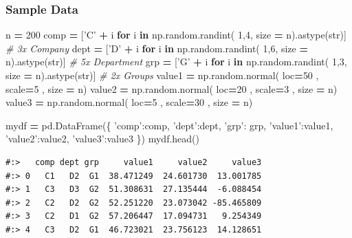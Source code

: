 \documentclass[
]{book}
\newenvironment{Shaded}{\begin{snugshade}}{\end{snugshade}}
\newcommand{\BuiltInTok}[1]{#1}
\newcommand{\CommentTok}[1]{\textcolor[rgb]{0.37,0.37,0.37}{\textit{#1}}}
\newcommand{\ControlFlowTok}[1]{\textcolor[rgb]{0.27,0.27,0.27}{\textbf{#1}}}
\newcommand{\DecValTok}[1]{\textcolor[rgb]{0.06,0.06,0.06}{#1}}
\newcommand{\KeywordTok}[1]{\textcolor[rgb]{0.27,0.27,0.27}{\textbf{#1}}}
\newcommand{\NormalTok}[1]{#1}
\newcommand{\OperatorTok}[1]{\textcolor[rgb]{0.43,0.43,0.43}{\textbf{#1}}}
\newcommand{\StringTok}[1]{\textcolor[rgb]{0.5,0.5,0.5}{#1}}
\begin{document}
\hypertarget{sample-data-2}{%
\subsubsection{Sample Data}\label{sample-data-2}}

\begin{Shaded}
\begin{Highlighting}[]
\NormalTok{n }\OperatorTok{=} \DecValTok{200}
\NormalTok{comp }\OperatorTok{=}\NormalTok{ [}\StringTok{'C'} \OperatorTok{+}\NormalTok{ i }\ControlFlowTok{for}\NormalTok{ i }\KeywordTok{in}\NormalTok{ np.random.randint( }\DecValTok{1}\NormalTok{,}\DecValTok{4}\NormalTok{, size  }\OperatorTok{=}\NormalTok{ n).astype(}\BuiltInTok{str}\NormalTok{)] }\CommentTok{# 3x Company}
\NormalTok{dept }\OperatorTok{=}\NormalTok{ [}\StringTok{'D'} \OperatorTok{+}\NormalTok{ i }\ControlFlowTok{for}\NormalTok{ i }\KeywordTok{in}\NormalTok{ np.random.randint( }\DecValTok{1}\NormalTok{,}\DecValTok{6}\NormalTok{, size  }\OperatorTok{=}\NormalTok{ n).astype(}\BuiltInTok{str}\NormalTok{)] }\CommentTok{# 5x Department}
\NormalTok{grp }\OperatorTok{=}\NormalTok{  [}\StringTok{'G'} \OperatorTok{+}\NormalTok{ i }\ControlFlowTok{for}\NormalTok{ i }\KeywordTok{in}\NormalTok{ np.random.randint( }\DecValTok{1}\NormalTok{,}\DecValTok{3}\NormalTok{, size  }\OperatorTok{=}\NormalTok{ n).astype(}\BuiltInTok{str}\NormalTok{)] }\CommentTok{# 2x Groups}
\NormalTok{value1 }\OperatorTok{=}\NormalTok{ np.random.normal( loc}\OperatorTok{=}\DecValTok{50}\NormalTok{ , scale}\OperatorTok{=}\DecValTok{5}\NormalTok{ , size }\OperatorTok{=}\NormalTok{ n)}
\NormalTok{value2 }\OperatorTok{=}\NormalTok{ np.random.normal( loc}\OperatorTok{=}\DecValTok{20}\NormalTok{ , scale}\OperatorTok{=}\DecValTok{3}\NormalTok{ , size }\OperatorTok{=}\NormalTok{ n)}
\NormalTok{value3 }\OperatorTok{=}\NormalTok{ np.random.normal( loc}\OperatorTok{=}\DecValTok{5}\NormalTok{ , scale}\OperatorTok{=}\DecValTok{30}\NormalTok{ , size }\OperatorTok{=}\NormalTok{ n)}

\NormalTok{mydf }\OperatorTok{=}\NormalTok{ pd.DataFrame(\{}
    \StringTok{'comp'}\NormalTok{:comp, }
    \StringTok{'dept'}\NormalTok{:dept, }
    \StringTok{'grp'}\NormalTok{: grp,}
    \StringTok{'value1'}\NormalTok{:value1, }
    \StringTok{'value2'}\NormalTok{:value2,}
    \StringTok{'value3'}\NormalTok{:value3 \})}
\NormalTok{mydf.head()}
\end{Highlighting}
\end{Shaded}

\begin{verbatim}
#:>   comp dept grp     value1     value2     value3
#:> 0   C1   D2  G1  38.471249  24.601730  13.001785
#:> 1   C3   D3  G2  51.308631  27.135444  -6.088454
#:> 2   C2   D2  G2  52.251220  23.073042 -85.465809
#:> 3   C2   D1  G2  57.206447  17.094731   9.254349
#:> 4   C3   D2  G1  46.723021  23.756123  14.128651
\end{verbatim}
\end{document}
